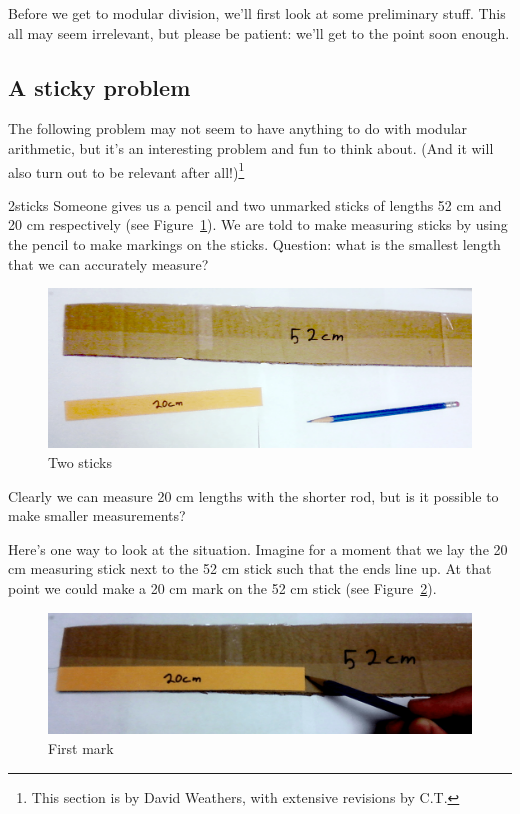  Before we get to modular division, we'll first look at some preliminary stuff. This all may seem irrelevant, but  please be patient: we'll get to the point soon enough.
 
 
\subsection{A sticky problem}
The following problem may not seem to have anything to do with modular arithmetic, but it's an interesting problem and fun to think about. (And it will also turn out to be relevant after all!)\footnote{This section is by David Weathers, with extensive revisions by C.T.}

\begin{example}{2sticks} Someone gives us a pencil and two unmarked sticks of lengths 52 cm and  20 cm respectively (see Figure~\ref{fig:1euclidean}). We are told to make measuring sticks by using the pencil to make markings on the sticks. Question: what is the smallest length that we can accurately measure? 
\begin{figure}
\begin{center} 
\includegraphics[width=1.00\textwidth]{images/2_sticks_step1.png}
\end {center}
\caption{Two sticks\label{fig:1euclidean}}
\end{figure}
Clearly we can measure 20 cm lengths with the shorter rod, but is it possible to make smaller measurements?

Here's one way to look at the situation. Imagine for a moment that we lay the 20 cm measuring stick next to the 52 cm stick such that the ends line up.  At that point we could make a 20 cm mark on the 52 cm stick (see Figure~\ref{fig:2}).
\begin{figure}
\begin{center} 
\includegraphics[width=1.00\textwidth]{images/2_sticks_step2.png}
\end {center}
\caption{First mark\label{fig:2}}
\end{figure}


\end{example}
